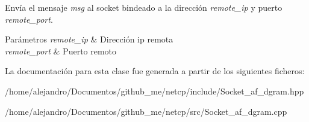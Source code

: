 Envía el mensaje {\itshape msg} al socket bindeado a la dirección {\itshape remote\+\_\+ip} y puerto {\itshape remote\+\_\+port}. 


\begin{DoxyParams}{Parámetros}
{\em remote\+\_\+ip} & Dirección ip remota \\
\hline
{\em remote\+\_\+port} & Puerto remoto \\
\hline
\end{DoxyParams}


La documentación para esta clase fue generada a partir de los siguientes ficheros\+:\begin{DoxyCompactItemize}
\item 
/home/alejandro/\+Documentos/github\+\_\+me/netcp/include/Socket\+\_\+af\+\_\+dgram.\+hpp\item 
/home/alejandro/\+Documentos/github\+\_\+me/netcp/src/Socket\+\_\+af\+\_\+dgram.\+cpp\end{DoxyCompactItemize}
